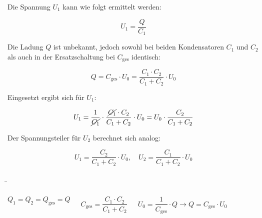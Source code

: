 \begin{frame}
{		
		Die Spannung $U_1$ kann wie folgt ermittelt werden:
		
		\begin{equation*}
			U_1 = \frac{Q}{C_1}
		\end{equation*}
		
		Die Ladung $Q$ ist unbekannt, jedoch sowohl bei beiden Kondensatoren $C_1$ und $C_2$ als auch in der Ersatzschaltung 
		bei $C_\mathrm{ges}$ identisch: 
		
		\begin{equation*}
			Q = C_\mathrm{ges} \cdot U_0 = \frac{C_1 \cdot C_2}{C_1 + C_2} \cdot U_0
		\end{equation*}
		
		Eingesetzt ergibt sich für $U_1$:
		
		\begin{equation*}
			U_1 = \frac{1}{\cancel{C_1}} \cdot \frac{\cancel{C_1} \cdot C_2}{C_1 + C_2} \cdot U_0 = U_0 \cdot \frac{C_2}{C_1 + C_2}
		\end{equation*}
		
		
		Der Spannungsteiler für $U_2$ berechnet sich analog:
		
		\begin{Merksatz}{}
			\begin{equation*}
				U_1 = \frac{C_2}{C_1 + C_2} \cdot U_0, \quad U_2 = \frac{C_1}{C_1 + C_2} \cdot U_0
			\end{equation*}
		\end{Merksatz}
		
		
	}
	
	\b{
	
	
		\begin{columns}
			\vspace*{-80pt}
			
			
			
			
			\begin{equation*}
				Q_1 = Q_2 = Q_\mathrm{ges} = Q
			\end{equation*}
			
			\vspace*{-5pt}
			
			\begin{equation*}
				C_\mathrm{ges} = \frac{C_1 \cdot C_2}{C_1 + C_2}
			\end{equation*}
			
			\vspace*{-10pt}
			
			\begin{equation*}
				U_0= \frac{1}{C_\mathrm{ges}} \cdot Q \rightarrow Q = C_\mathrm{ges} \cdot U_0
			\end{equation*}
			

\end{columns}}
\end{frame}
